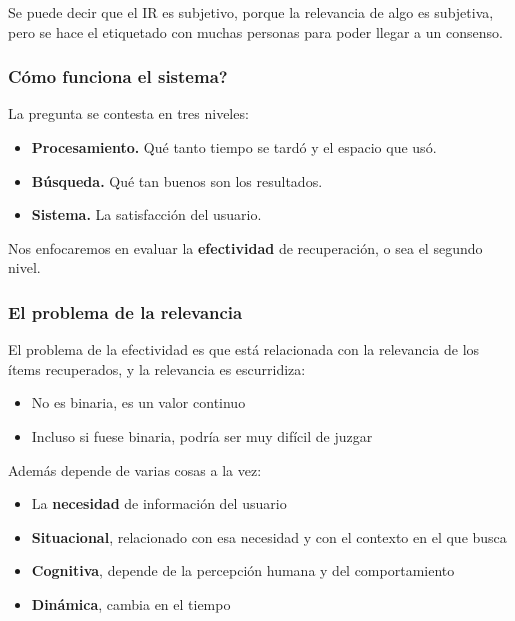 \documentclass[11pt,letterpaper]{article}
\begin{document}
Se puede decir que el IR es subjetivo, porque la relevancia de algo es
subjetiva, pero se hace el etiquetado con muchas personas para poder
llegar a un consenso.

\subsubsection*{Cómo funciona el sistema?}

La pregunta se contesta en tres niveles:

\begin{itemize}[itemsep=0.2em]
    \item \textbf{Procesamiento.} Qué tanto tiempo se tardó y el
          espacio que usó.
    \item \textbf{Búsqueda.} Qué tan buenos son los resultados.
    \item \textbf{Sistema.} La satisfacción del usuario.
\end{itemize}

Nos enfocaremos en evaluar la \textbf{efectividad} de recuperación, o
sea el segundo nivel.

\subsubsection*{El problema de la relevancia}

El problema de la efectividad es que está relacionada con la
relevancia de los ítems recuperados, y la relevancia es escurridiza:

\begin{itemize}[itemsep=0.1em]
    \item No es binaria, es un valor continuo
    \item Incluso si fuese binaria, podría ser muy difícil de juzgar
\end{itemize}

Además depende de varias cosas a la vez:

\begin{itemize}[itemsep=0.2em]
    \item La \textbf{necesidad} de información del usuario
    \item \textbf{Situacional}, relacionado con esa necesidad y con el
          contexto en el que busca
    \item \textbf{Cognitiva}, depende de la percepción humana y del
          comportamiento
    \item \textbf{Dinámica}, cambia en el tiempo
\end{itemize}
\end{document}
